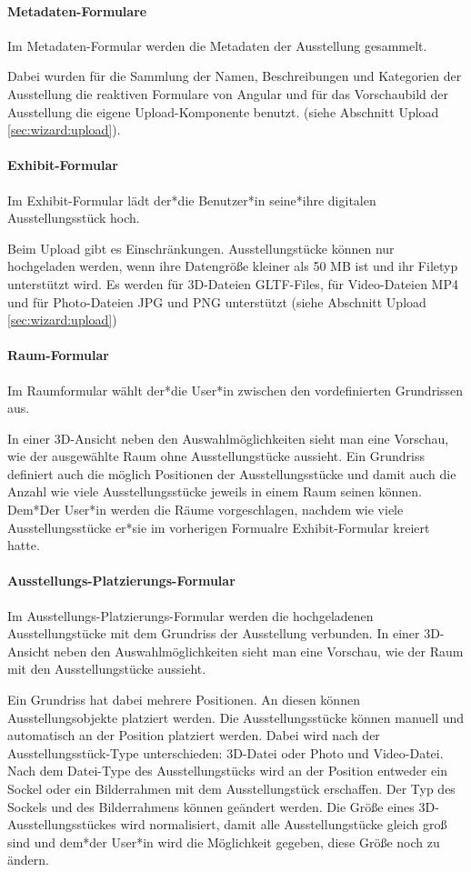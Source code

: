 \paragraph{Metadaten-Formulare}
Im Metadaten-Formular werden die Metadaten der Ausstellung gesammelt.


Dabei wurden für die Sammlung der Namen, Beschreibungen und Kategorien der Ausstellung die reaktiven Formulare von Angular und für das Vorschaubild der Ausstellung die eigene Upload-Komponente benutzt. (siehe Abschnitt Upload \ref{sec:wizard:upload}).


\paragraph{Exhibit-Formular}
Im Exhibit-Formular lädt der*die Benutzer*in seine*ihre digitalen Ausstellungsstück hoch.

Beim Upload gibt es Einschränkungen. Ausstellungstücke können nur hochgeladen werden, wenn ihre Datengröße kleiner als 50 MB ist und ihr Filetyp unterstützt wird. Es werden für 3D-Dateien GLTF-Files, für Video-Dateien MP4 und für Photo-Dateien JPG und PNG unterstützt (siehe Abschnitt Upload \ref{sec:wizard:upload})

\paragraph{Raum-Formular}
Im Raumformular wählt der*die User*in zwischen den vordefinierten Grundrissen aus.

In einer 3D-Ansicht neben den Auswahlmöglichkeiten sieht man eine Vorschau, wie der ausgewählte Raum ohne Ausstellungstücke aussieht. 
Ein Grundriss definiert auch die möglich Positionen der Ausstellungsstücke und damit auch die Anzahl wie viele Ausstellungsstücke jeweils in einem Raum seinen können. Dem*Der User*in werden die Räume vorgeschlagen, nachdem wie viele Ausstellungsstücke er*sie im vorherigen Formualre Exhibit-Formular kreiert hatte. 

\paragraph{Ausstellungs-Platzierungs-Formular}
Im Ausstellungs-Platzierungs-Formular werden die hochgeladenen Ausstellungstücke mit dem Grundriss der Ausstellung verbunden.  In einer 3D-Ansicht neben den Auswahlmöglichkeiten sieht man eine Vorschau, wie der Raum mit den Ausstellungstücke aussieht. 

Ein Grundriss hat dabei mehrere Positionen. An diesen können Ausstellungsobjekte platziert werden. Die Ausstellungsstücke können manuell und automatisch an der Position platziert werden.
Dabei wird nach der Ausstellungsstück-Type unterschieden: 3D-Datei oder Photo und Video-Datei. Nach dem Datei-Type des Ausstellungstücks wird an der Position entweder ein Sockel oder ein Bilderrahmen mit dem Ausstellungstück erschaffen. Der Typ des Sockels und des Bilderrahmens können geändert werden.
Die Größe eines 3D-Ausstellungsstückes wird normalisiert, damit alle Ausstellungstücke gleich groß sind und dem*der User*in wird die Möglichkeit gegeben, diese Größe noch zu ändern.

